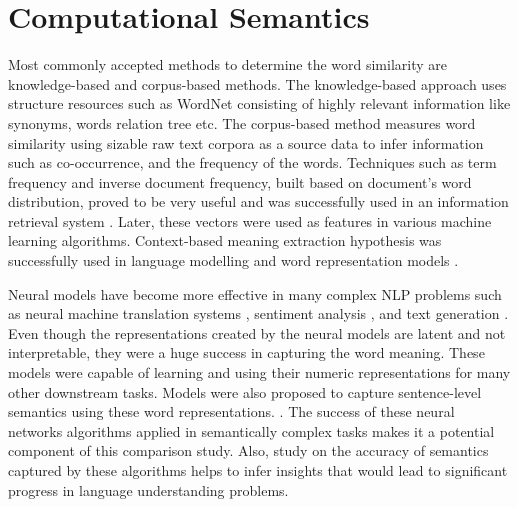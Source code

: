 \documentclass[12pt]{report} %
\begin{document}
	
	
	
	
	
	\section{Computational Semantics}
	
	Most commonly accepted methods to determine the word similarity are knowledge-based and corpus-based methods. The knowledge-based approach uses structure resources such as WordNet \citep{pedersen2004wordnet} consisting of highly relevant information like synonyms, words relation tree etc. The corpus-based method measures word similarity using sizable raw text corpora as a source data to infer information such as co-occurrence, and the frequency of the words.
	Techniques such as term frequency and inverse document frequency, built based on document's word distribution, proved to be very useful and was successfully used in an information retrieval system \citep{salton1971smart, deerwester1989computer}. 
	Later, these vectors were used as features in various machine learning algorithms. Context-based meaning extraction hypothesis was successfully used in language modelling \citep{bengio2003neural,collobert2008unified,collobert2011natural,mikolov2011extensions} and word representation models \citep{mikolov2014word2vec,pennington2014glove}. 
	
	
	Neural models have become more effective in many complex NLP problems such as neural machine translation systems \citep{luong2015effective}, sentiment analysis \citep{socher2011semi}, and text generation \citep{wen2015semantically} . Even though the representations created by the neural models are latent and not interpretable, they were a huge success in capturing the word meaning. These models were capable of learning and using their numeric representations for many other downstream tasks. Models were also proposed to capture sentence-level semantics using these word representations.  \citep{kiros2015skip,conneau2017supervised,shao2017hcti}. The success of these neural networks algorithms applied in semantically complex tasks makes it a potential component of this comparison study. Also, study on the accuracy of semantics captured by these algorithms helps to infer insights that would lead to significant progress in language understanding problems.
	
	
	
\end{document}
